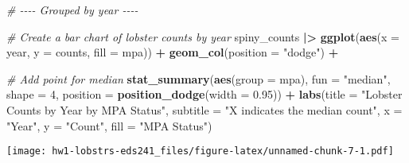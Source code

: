 \documentclass[
]{article}
\newenvironment{Shaded}{\begin{snugshade}}{\end{snugshade}}
\newcommand{\AttributeTok}[1]{\textcolor[rgb]{0.13,0.29,0.53}{#1}}
\newcommand{\CommentTok}[1]{\textcolor[rgb]{0.56,0.35,0.01}{\textit{#1}}}
\newcommand{\DecValTok}[1]{\textcolor[rgb]{0.00,0.00,0.81}{#1}}
\newcommand{\FloatTok}[1]{\textcolor[rgb]{0.00,0.00,0.81}{#1}}
\newcommand{\FunctionTok}[1]{\textcolor[rgb]{0.13,0.29,0.53}{\textbf{#1}}}
\newcommand{\NormalTok}[1]{#1}
\newcommand{\SpecialCharTok}[1]{\textcolor[rgb]{0.81,0.36,0.00}{\textbf{#1}}}
\newcommand{\StringTok}[1]{\textcolor[rgb]{0.31,0.60,0.02}{#1}}
\begin{document}
\begin{Shaded}
\begin{Highlighting}[]
\CommentTok{\# {-}{-}{-}{-} Grouped by year {-}{-}{-}{-}}

\CommentTok{\# Create a bar chart of lobster counts by year}
\NormalTok{spiny\_counts }\SpecialCharTok{|\textgreater{}}
\FunctionTok{ggplot}\NormalTok{(}\FunctionTok{aes}\NormalTok{(}\AttributeTok{x =}\NormalTok{ year, }\AttributeTok{y =}\NormalTok{ counts, }\AttributeTok{fill =}\NormalTok{ mpa)) }\SpecialCharTok{+} 
    \FunctionTok{geom\_col}\NormalTok{(}\AttributeTok{position =} \StringTok{"dodge"}\NormalTok{) }\SpecialCharTok{+}
    
    \CommentTok{\# Add point for median}
    \FunctionTok{stat\_summary}\NormalTok{(}\FunctionTok{aes}\NormalTok{(}\AttributeTok{group =}\NormalTok{ mpa),}
                 \AttributeTok{fun =} \StringTok{"median"}\NormalTok{,}
                 \AttributeTok{shape =} \DecValTok{4}\NormalTok{,}
                 \AttributeTok{position =} \FunctionTok{position\_dodge}\NormalTok{(}\AttributeTok{width =} \FloatTok{0.95}\NormalTok{)) }\SpecialCharTok{+}
    \FunctionTok{labs}\NormalTok{(}\AttributeTok{title =} \StringTok{"Lobster Counts by Year by MPA Status"}\NormalTok{,}
         \AttributeTok{subtitle =} \StringTok{"X indicates the median count"}\NormalTok{,}
         \AttributeTok{x =} \StringTok{"Year"}\NormalTok{,}
         \AttributeTok{y =} \StringTok{"Count"}\NormalTok{,}
         \AttributeTok{fill =} \StringTok{"MPA Status"}\NormalTok{) }
\end{Highlighting}
\end{Shaded}

\texttt{[image: hw1-lobstrs-eds241\_files/figure-latex/unnamed-chunk-7-1.pdf]}
\end{document}
